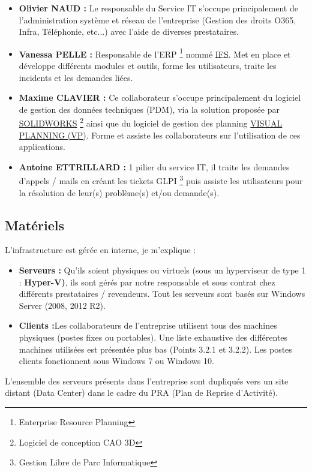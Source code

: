 \documentclass[11pt,a4paper,oneside]{article}
\begin{document}
\begin{itemize}
    \item \textbf{Olivier NAUD :} Le responsable du Service IT s'occupe principalement de l'administration système et réseau de l'entreprise (Gestion des droits O365, Infra, Téléphonie, etc...) avec l'aide de diverses prestataires. \\
    \item \textbf{Vanessa PELLE :} Responsable de l'ERP \footnote{Enterprise Resource Planning} nommé \hyperlink{https://www.ifsworld.com/fr/}{IFS}. Met en place et développe  différents modules et outils, forme les utilisateurs, traite les incidents et les demandes liées. \\
    \item \textbf{Maxime CLAVIER :} Ce collaborateur s’occupe principalement du logiciel de gestion des données techniques (PDM), via la solution proposée par \hyperlink{https://www.solidworks.com/fr}{SOLIDWORKS} \footnote{Logiciel de conception CAO 3D} ainsi que du logiciel de gestion des planning \hyperlink{https://www.visual-planning.com/fr/}{VISUAL PLANNING  (VP)}. Forme et assiste les collaborateurs sur l’utilisation de ces applications.\\
    \item \textbf{Antoine ETTRILLARD :} 1\ier{} pilier du service IT, il traite les demandes d'appels / mails en créant les tickets GLPI \footnote{Gestion Libre de Parc Informatique} puis assiste les utilisateurs pour la résolution de leur(s) problème(s) et/ou demande(s).
\end{itemize}
   
\subsection{Matériels}
L'infrastructure est gérée en interne, je m'explique :

\begin{itemize}
    \item \textbf{Serveurs :} Qu'ils soient physiques ou virtuels (sous un hyperviseur de type 1 : \textbf{Hyper-V)}, ils sont gérés par notre responsable et sous contrat chez différents prestataires / revendeurs. Tout les serveurs sont basés sur Windows Server (2008, 2012 R2).\\
    \item \textbf{Clients :}Les collaborateurs de l’entreprise utilisent tous des machines physiques (postes fixes ou portables). Une liste exhaustive des différentes machines utilisées est présentée plus bas (Points 3.2.1 et 3.2.2). Les postes clients fonctionnent sous Windows 7 ou Windows 10. \\
\end{itemize}
L’ensemble des serveurs présents dans l’entreprise sont dupliqués vers un site distant (Data Center) dans le cadre du PRA (Plan de Reprise d’Activité).
\end{document}
